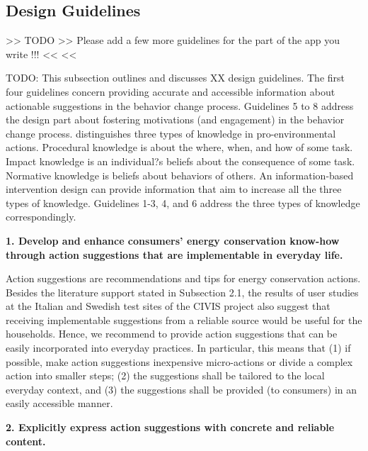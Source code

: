 \subsection{Design Guidelines} 

>>
TODO >> Please add a few more guidelines for the part of the app you write !!! <<
<<

\vspace{1cm}

TODO: This subsection outlines and discusses XX design guidelines. The first four guidelines concern providing accurate and accessible information about actionable suggestions in the behavior change process. Guidelines 5 to 8 address the design part about fostering motivations (and engagement) in the behavior change process. \citet{Schultz2002} distinguishes three types of knowledge in pro-environmental actions. Procedural knowledge is about the where, when, and how of some task. Impact knowledge is an individual?s beliefs about the consequence of some task. Normative knowledge is beliefs about behaviors of others. An information-based intervention design can provide information that aim to increase all the three types of knowledge. Guidelines 1-3, 4, and 6 address the three types of knowledge correspondingly.

\vspace{.3cm}
\noindent\textbf{1. Develop and enhance consumers' energy conservation know-how through action suggestions that are implementable in everyday life.}

Action suggestions are recommendations and tips for energy conservation actions. Besides the literature support stated in Subsection 2.1, the results of user studies at the Italian and Swedish test sites of the CIVIS project also suggest that receiving implementable suggestions from a reliable source would be useful for the households. Hence, we recommend to provide action suggestions that can be easily incorporated into everyday practices. In particular, this means that (1) if possible, make action suggestions inexpensive micro-actions or divide a complex action into smaller steps; (2) the suggestions shall be tailored to the local everyday context, and (3) the suggestions shall be provided (to consumers) in an easily accessible manner. 

\vspace{.3cm}
\noindent\textbf{2. Explicitly express action suggestions with concrete and reliable content.}

